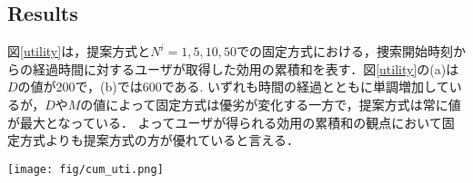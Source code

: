 \documentclass{ieeeaccess}
\begin{document}
\subsection{Results}
図\ref{utility}は，提案方式と$N^i=1, 5, 10, 50$での固定方式における，捜索開始時刻からの経過時間に対するユーザが取得した効用の累積和を表す．図\ref{utility}の(a)は$D$の値が200で，(b)では600である.
いずれも時間の経過とともに単調増加しているが，$D$や$M$の値によって固定方式は優劣が変化する一方で，提案方式は常に値が最大となっている．
よってユーザが得られる効用の累積和の観点において固定方式よりも提案方式の方が優れていると言える．

\begin{figure*}[t]
\begin{center}
\texttt{[image: fig/cum\_uti.png]}
\caption{Cumulative sum of utilities}
\label{utility}
\end{center}
\end{figure*}
\end{document}
